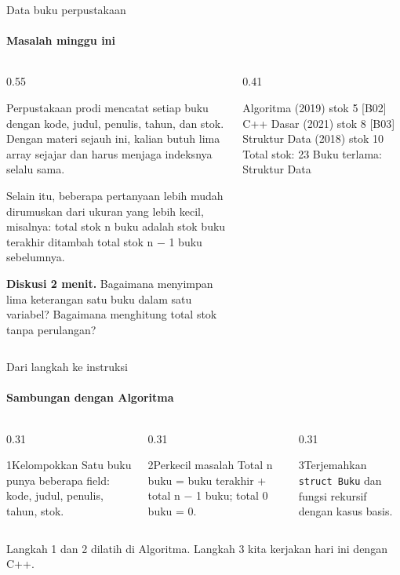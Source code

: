 \documentclass[t]{beamer}
\begin{document}

\begin{frame}[fragile]{Data buku perpustakaan}
\framesubtitle{Masalah minggu ini}
\begin{columns}[T]
\begin{column}{0.55\textwidth}
{\small Perpustakaan prodi mencatat setiap buku dengan kode, judul, penulis, tahun, dan stok. Dengan materi sejauh ini, kalian butuh lima array sejajar dan harus menjaga indeksnya selalu sama.

\vspace{6pt}
Selain itu, beberapa pertanyaan lebih mudah dirumuskan dari ukuran yang lebih kecil, misalnya: total stok n buku adalah stok buku terakhir ditambah total stok n − 1 buku sebelumnya.\par}
\vspace{6pt}
\begin{Catatan}
\textbf{Diskusi 2 menit.} Bagaimana menyimpan lima keterangan satu buku dalam satu variabel? Bagaimana menghitung total stok tanpa perulangan?
\end{Catatan}
\end{column}
\begin{column}{0.41\textwidth}
\begin{Keluaran}[]
[B01] Algoritma (2019) stok 5
[B02] C++ Dasar (2021) stok 8
[B03] Struktur Data (2018) stok 10
Total stok: 23
Buku terlama: Struktur Data
\end{Keluaran}
\end{column}
\end{columns}
\end{frame}

\begin{frame}{Dari langkah ke instruksi}
\framesubtitle{Sambungan dengan Algoritma}
\begin{columns}[T]
\begin{column}{0.31\textwidth}
\begin{Langkah}{1}{Kelompokkan}
Satu buku punya beberapa field: kode, judul, penulis, tahun, stok.
\end{Langkah}
\end{column}
\begin{column}{0.31\textwidth}
\begin{Langkah}{2}{Perkecil masalah}
Total n buku = buku terakhir + total n − 1 buku; total 0 buku = 0.
\end{Langkah}
\end{column}
\begin{column}{0.31\textwidth}
\begin{Langkah}{3}{Terjemahkan}
\texttt{struct Buku} dan fungsi rekursif dengan kasus basis.
\end{Langkah}
\end{column}
\end{columns}
\vspace{10pt}
Langkah 1 dan 2 dilatih di Algoritma. Langkah 3 kita kerjakan hari ini dengan C++.
\end{frame}
\end{document}
